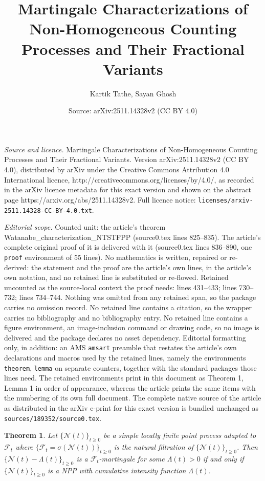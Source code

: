 \documentclass[10pt,a4paper]{amsart}
\title{Martingale Characterizations of Non-Homogeneous Counting Processes and Their Fractional Variants}
\author{Kartik Tathe, Sayan Ghosh}
\date{Source: arXiv:2511.14328v2 (CC BY 4.0)}
\newtheorem{theorem}{Theorem}
\begin{document}
\maketitle

\noindent\emph{Source and licence.} Martingale Characterizations of Non-Homogeneous Counting Processes and Their Fractional Variants. Version arXiv:2511.14328v2 (CC BY 4.0), distributed by arXiv under the Creative Commons Attribution 4.0 International licence, http://creativecommons.org/licenses/by/4.0/, as recorded in the arXiv licence metadata for this exact version and shown on the abstract page https://arxiv.org/abs/2511.14328v2. Full licence notice: \texttt{licenses/arxiv-2511.14328-CC-BY-4.0.txt}.\par\smallskip

\noindent\textit{Editorial scope.} Counted unit: the article's theorem Watanabe\_characterization\_NTSTFPP (source0.tex lines 825--835). The article's complete original proof of it is delivered with it (source0.tex lines 836--890, one \texttt{proof} environment of 55 lines). No mathematics is written, repaired or re-derived: the statement and the proof are the article's own lines, in the article's own notation, and no retained line is substituted or re-flowed.  Retained uncounted as the source-local context the proof needs: lines 431--433; lines 730--732; lines 734--744.  Nothing was omitted from any retained span, so the package carries no omission record.  No retained line contains a citation, so the wrapper carries no bibliography and no bibliography entry.  No retained line contains a figure environment, an image-inclusion command or drawing code, so no image is delivered and the package declares no asset dependency.  Editorial formatting only, in addition: an AMS \texttt{amsart} preamble that restates the article's own declarations and macros used by the retained lines, namely the environments \texttt{theorem}, \texttt{lemma} on separate counters, together with the standard packages those lines need.  The retained environments print in this document as Theorem 1, Lemma 1 in order of appearance, whereas the article prints the same items with the numbering of its own full document.  The complete native source of the article as distributed in the arXiv e-print for this exact version is bundled unchanged as \texttt{sources/189352/source0.tex}.
\begin{theorem}\label{watanabe_npp}
Let $\{\mathcal{N}(t)\}_{t\ge 0}$ be a simple locally finite point process adapted to $\mathcal{F}_t$ where $\{\mathcal{F}_t=\sigma(\mathcal{N}(t))\}_{t\ge 0}$ is the natural filtration of $\{\mathcal{N}(t)\}_{t\ge 0}$. Then $\{\mathcal{N}(t)-\Lambda(t)\}_{t\ge 0}$ is a $\mathcal{F}_t$-martingale for some $\Lambda(t)>0$ if and only if $\{\mathcal{N}(t)\}_{t\ge 0}$ is a NPP with cumulative intensity function $\Lambda(t)$. 
\end{theorem}
\end{document}
